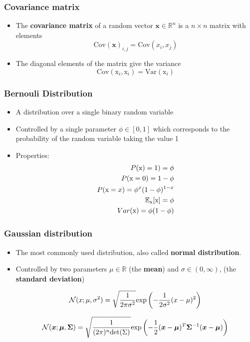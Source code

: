 \documentclass[notes]{beamer}          %
\newcommand{\vect}[1]{\bm{#1}}
\newcommand{\field}[1]{\mathbb{#1}}
\newcommand{\R}{\field{R}}
\begin{document}
\begin{frame}
\frametitle{Covariance matrix}
    \begin{itemize}
        \item The {\bf covariance matrix} of a random vector $\vect{x} \in \R^n$ is a $n \times n$ matrix with elements
    $$
    \mbox{Cov}(\vect{x})_{i,j} = \mbox{Cov}(x_i,x_j)
    $$
    \item The diagonal elements of the matrix give the variance
    $$
      \mbox{Cov}(\text{x}_i,\text{x}_i) = \mbox{Var}(\text{x}_i)
    $$
    \end{itemize}

\end{frame}



\begin{frame}
\frametitle{Bernouli Distribution}
\begin{itemize}
    \item A distribution over a single binary random variable
    \item Controlled by a single parameter $\phi \in [0,1]$ which corresponds to the probability of the random variable taking the value 1
    \item Properties:
    \begin{eqnarray*}
    P({\rm x}) = 1) = \phi \\
    P({\rm x} = 0) = 1 - \phi \\
    P({\rm x} = x) = \phi^x (1-\phi)^{1-x} \\
    \field{E}_\text{x}[\text{x}] = \phi \\
    Var(\text{x}) = \phi(1-\phi)
    \end{eqnarray*}
\end{itemize}
\end{frame}

\begin{frame}
\frametitle{Gaussian distribution}
\begin{itemize}
    \item The most commonly used distribution, also called {\bf normal distribution}.
    \item Controlled by two parameters $\mu \in \R$ (the {\bf mean}) and $\sigma \in (0, \infty)$, (the {\bf standard deviation})

    $$
    {\cal N}(x ; \mu, \sigma^2) = \sqrt{\frac{1}{2 \pi \sigma^2}} \mbox{exp} \left (-\frac{1}{2 \sigma^2}(x - \mu)^2 \right )
    $$

    $$
    {\cal N}(\vect{x} ; \vect{\mu}, \vect{\Sigma}) = \sqrt{\frac{1}{(2 \pi)^n \mbox{det}(\Sigma)}} \mbox{exp} \left (-\frac{1}{2} (\vect{x} - \vect{\mu})^T \vect{\Sigma}^{-1} (\vect{x} - \vect{\mu}) \right )
    $$


\end{itemize}
\end{frame}
\end{document}
